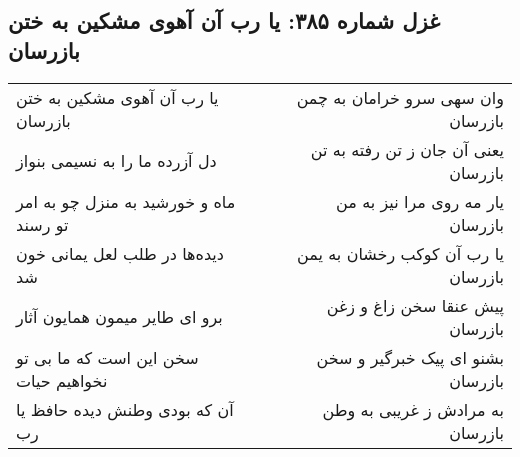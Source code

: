 \begin{center}
\section*{غزل شماره ۳۸۵: یا رب آن آهوی مشکین به ختن بازرسان}
\label{sec:sh385}
\begin{longtable}{l p{0.5cm} r}
یا رب آن آهوی مشکین به ختن بازرسان
&&
وان سهی سرو خرامان به چمن بازرسان
\\
دل آزرده ما را به نسیمی بنواز
&&
یعنی آن جان ز تن رفته به تن بازرسان
\\
ماه و خورشید به منزل چو به امر تو رسند
&&
یار مه روی مرا نیز به من بازرسان
\\
دیده‌ها در طلب لعل یمانی خون شد
&&
یا رب آن کوکب رخشان به یمن بازرسان
\\
برو ای طایر میمون همایون آثار
&&
پیش عنقا سخن زاغ و زغن بازرسان
\\
سخن این است که ما بی تو نخواهیم حیات
&&
بشنو ای پیک خبرگیر و سخن بازرسان
\\
آن که بودی وطنش دیده حافظ یا رب
&&
به مرادش ز غریبی به وطن بازرسان
\\
\end{longtable}
\end{center}
